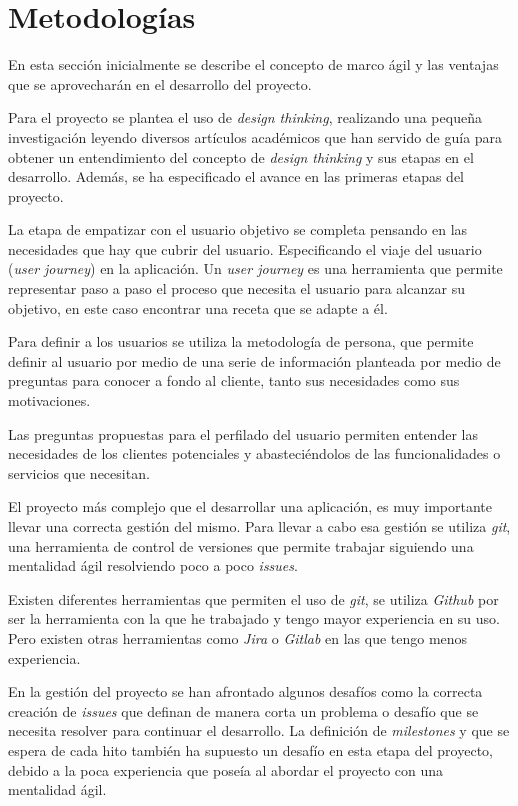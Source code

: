 \section{Metodologías}
En esta sección inicialmente se describe el concepto de marco ágil y las ventajas que se aprovecharán en el desarrollo del proyecto. 

Para el proyecto se plantea el uso de \emph{design thinking}, realizando una pequeña investigación leyendo diversos artículos académicos\cite{wolniak2017design}\cite{thoring2011understanding} que han servido de guía para obtener un entendimiento del concepto de \emph{design thinking} y sus etapas en el desarrollo. Además, se ha especificado el avance en las primeras etapas del proyecto.

La etapa de empatizar con el usuario objetivo se completa pensando en las necesidades que hay que cubrir del usuario. Especificando el viaje del usuario (\emph{user journey}) en la aplicación. Un \emph{user journey} es una herramienta que permite representar paso a paso el proceso que necesita el usuario para alcanzar su objetivo, en este caso encontrar una receta que se adapte a él. \cite{gasparini2015perspective}

Para definir a los usuarios se utiliza la metodología de persona, que permite definir al usuario por medio de una serie de información planteada por medio de preguntas para conocer a fondo al cliente, tanto sus necesidades como sus motivaciones. 

Las preguntas propuestas para el perfilado del usuario permiten entender las necesidades de los clientes potenciales y abasteciéndolos de las funcionalidades o servicios que necesitan.

El proyecto más complejo que el desarrollar una aplicación, es muy importante llevar una correcta gestión del mismo. Para llevar a cabo esa gestión se utiliza \emph{git}, una herramienta de control de versiones que permite trabajar siguiendo una mentalidad ágil resolviendo poco a poco \emph{issues}.

Existen diferentes herramientas que permiten el uso de \emph{git}, se utiliza \emph{Github} por ser la herramienta con la que he trabajado y tengo mayor experiencia en su uso. Pero existen otras herramientas como \emph{Jira} o \emph{Gitlab} en las que tengo menos experiencia.

En la gestión del proyecto se han afrontado algunos desafíos como la correcta creación de \emph{issues} que definan de manera corta un problema o desafío que se necesita resolver para continuar el desarrollo. La definición de \emph{milestones} y que se espera de cada hito también ha supuesto un desafío en esta etapa del proyecto, debido a la poca experiencia que poseía al abordar el proyecto con una mentalidad ágil.

